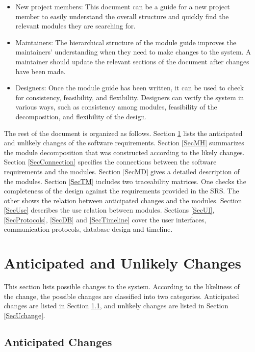 \documentclass[12pt, titlepage]{article}
\begin{document}
\begin{itemize}
\item New project members: This document can be a guide for a new project member
  to easily understand the overall structure and quickly find the
  relevant modules they are searching for.
\item Maintainers: The hierarchical structure of the module guide improves the
  maintainers' understanding when they need to make changes to the system. A
  maintainer should update the relevant sections of the document after changes
  have been made.
\item Designers: Once the module guide has been written, it can be used to
  check for consistency, feasibility, and flexibility. Designers can verify the
  system in various ways, such as consistency among modules, feasibility of the
  decomposition, and flexibility of the design.
\end{itemize}

The rest of the document is organized as follows. Section
\ref{SecChange} lists the anticipated and unlikely changes of the software
requirements. Section \ref{SecMH} summarizes the module decomposition that
was constructed according to the likely changes. Section \ref{SecConnection}
specifies the connections between the software requirements and the
modules. Section \ref{SecMD} gives a detailed description of the
modules. Section \ref{SecTM} includes two traceability matrices. One checks
the completeness of the design against the requirements provided in the SRS. The
other shows the relation between anticipated changes and the modules. Section
\ref{SecUse} describes the use relation between modules. Sections
\ref{SecUI}, \ref{SecProtocols}, \ref{SecDB} and \ref{SecTimeline} cover the
user interfaces, communication protocols, database design and timeline.

\section{Anticipated and Unlikely Changes} \label{SecChange}

This section lists possible changes to the system. According to the likeliness
of the change, the possible changes are classified into two
categories. Anticipated changes are listed in Section \ref{SecAchange}, and
unlikely changes are listed in Section \ref{SecUchange}.

\subsection{Anticipated Changes} \label{SecAchange}
\end{document}
